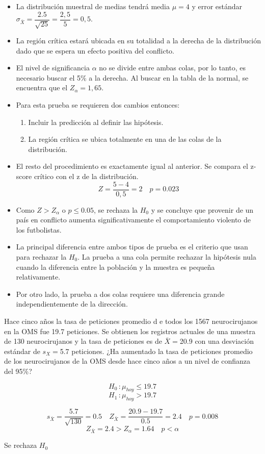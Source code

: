 \documentclass{beamer}
\begin{document}
\begin{frame}
\begin{itemize}
\justifying
\item La distribución muestral de medias tendrá media $\mu=4$ y error estándar $\sigma_{\bar{X}}=\dfrac{2.5}{\sqrt{25}}=\dfrac{2,5}{5}=0,5$.
\item La región crítica estará ubicada en su totalidad a la derecha de la distribución dado que se espera un efecto positiva del conflicto.
\item El nivel de significancia $\alpha$ no se divide entre ambas colas, por lo tanto, es necesario buscar el 5\% a la derecha. Al buscar en la tabla de la normal, se encuentra que el $Z_{\alpha}=1,65$.
\item Para esta prueba se requieren dos cambios entonces:
\begin{enumerate}
\item Incluir la predicción al definir las hipótesis.
\item La región crítica se ubica totalmente en una de las colas de la distribución.
\end{enumerate}
\end{itemize}
\end{frame}

\begin{frame}
\begin{itemize}
	\justifying
\item El resto del procedimiento es exactamente igual al anterior. Se compara el z-score crítico con el z de la distribución.
$$Z=\dfrac{5-4}{0,5}=2 \quad p=0.023$$
\item Como $Z>Z_{\alpha}$ o $p\leq0.05$, se rechaza la $H_0$ y se concluye que provenir de un país en conflicto aumenta significativamente el comportamiento violento de los futbolistas.
\item La principal diferencia entre ambos tipos de prueba es el criterio que usan para rechazar la $H_0$. La prueba a una cola permite rechazar la hipótesis nula cuando la diferencia entre la población y la muestra es pequeña relativamente. 
\item Por otro lado, la prueba a dos colas requiere una diferencia grande independientemente de la dirección.  
\end{itemize}
\end{frame}

\begin{frame}
	\justifying
Hace cinco años la tasa de peticiones promedio d e todos los 1567 neurocirujanos en la OMS fue 19.7 peticiones. Se obtienen los registros actuales de una muestra de 130 neurocirujanos y la tasa de peticiones es de $\bar{X}=$20.9 con una desviación estándar de $s_X=$5.7 peticiones. ¿Ha aumentado la tasa de peticiones promedio de los neurocirujanos de la OMS desde hace cinco años a un nivel de confianza del 95\%?

\pause
$$H_0 \, : \mu_{hoy}\leq19.7$$
$$H_1 \, : \mu_{hoy}>19.7$$

$$s_{\bar{X}}=\dfrac{5.7}{\sqrt{130}}=0.5 \quad Z_{\bar{X}}=\dfrac{20.9-19.7}{0.5}=2.4 \quad p=0.008$$
$$Z_{\bar{X}}=2.4>Z_{\alpha}=1.64 \quad p<\alpha$$
\begin{center}
Se rechaza $H_0$
\end{center}
\end{frame}
\end{document}
